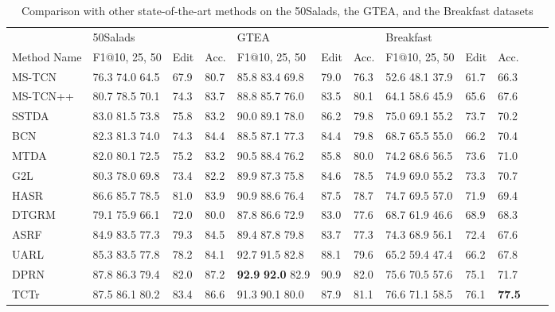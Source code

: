 \documentclass[sn-mathphys,Numbered]{sn-jnl}
\theoremstyle{thmstyleone}\newtheorem{theorem}{Theorem}\newtheorem{proposition}[theorem]{Proposition}
\theoremstyle{thmstyletwo}\newtheorem{example}{Example}\newtheorem{remark}{Remark}
\theoremstyle{thmstylethree}\newtheorem{definition}{Definition}
\begin{document}
\begin{table}[h]
\centering
\caption{Comparison with other state-of-the-art methods on the 50Salads, the GTEA, and the Breakfast datasets}\label{tab6}
\setlength{\tabcolsep}{3pt}

\begin{tabular}{llllllllllll}
\hline

& 50Salads & & &  GTEA & & &  Breakfast & & &\\
\cmidrule{2-11}

Method Name &  F1@{10, 25, 50} & Edit & Acc.&  F1@{10, 25, 50} & Edit & Acc.&  F1@{10, 25, 50} & Edit & Acc.\\
\hline
MS-TCN \cite{farha2019ms}& 76.3 74.0 64.5 & 67.9 & 80.7 & 85.8 83.4 69.8 & 79.0 & 76.3 & 52.6 48.1 37.9 & 61.7 & 66.3\\
MS-TCN++ \cite{li2020ms} & 80.7 78.5 70.1 & 74.3 & 83.7 & 88.8 85.7 76.0 & 83.5 & 80.1 & 64.1 58.6 45.9 & 65.6 & 67.6\\
SSTDA \cite{chen2020action} & 83.0 81.5 73.8 & 75.8 & 83.2 & 90.0 89.1 78.0 & 86.2 & 79.8 & 75.0 69.1 55.2 & 73.7 & 70.2\\
BCN \cite{wang2020boundary}& 82.3 81.3 74.0 & 74.3 & 84.4 & 88.5 87.1 77.3 & 84.4 & 79.8 & 68.7 65.5 55.0 & 66.2 & 70.4\\
MTDA \cite{chen2020actionb} & 82.0 80.1 72.5 & 75.2 & 83.2 & 90.5 88.4 76.2 & 85.8 & 80.0 & 74.2 68.6 56.5 & 73.6 & 71.0\\
G2L \cite{gao2021global2local} & 80.3 78.0 69.8 & 73.4 & 82.2 & 89.9 87.3 75.8 & 84.6 & 78.5 & 74.9 69.0 55.2 & 73.3 & 70.7\\
HASR \cite{ahn2021refining} & 86.6 85.7 78.5 & 81.0 & 83.9 & 90.9 88.6 76.4 & 87.5 & 78.7 & 74.7 69.5 57.0 & 71.9 & 69.4\\
DTGRM \cite{wang2021temporal}& 79.1 75.9 66.1 & 72.0  & 80.0 & 87.8 86.6 72.9 & 83.0 & 77.6 & 68.7 61.9 46.6 & 68.9 & 68.3\\
ASRF \cite{ishikawa2021alleviating}& 84.9 83.5 77.3 & 79.3  & 84.5 & 89.4 87.8 79.8 & 83.7 & 77.3 & 74.3 68.9 56.1 & 72.4 & 67.6\\
UARL \cite{chen2022uncertainty} & 85.3 83.5 77.8 & 78.2 & 84.1 & 92.7 91.5 82.8 & 88.1 & 79.6 & 65.2 59.4 47.4 & 66.2 & 67.8\\
DPRN \cite{park2022maximization} & 87.8 86.3 79.4 & 82.0 & 87.2 & \textbf{92.9} \textbf{92.0} 82.9 & 90.9 & 82.0 & 75.6 70.5 57.6 & 75.1 & 71.7\\
TCTr \cite{aziere2022multistage} & 87.5 86.1 80.2 & 83.4 & 86.6 & 91.3 90.1 80.0 & 87.9 & 81.1 & 76.6 71.1 58.5 & 76.1 & \textbf{77.5}\\

\end{tabular}
\end{table}
\end{document}
